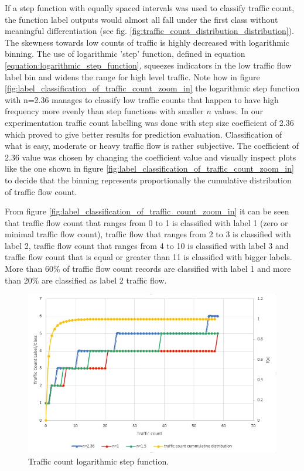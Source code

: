 \documentclass[12pt, a4paper]{report}
\theoremstyle{definition}
\theoremstyle{definition}%
\theoremstyle{definition}%
\theoremstyle{definition}%
\theoremstyle{definition}%
\theoremstyle{definition}%
\begin{document}
If a step function with equally spaced intervals was used to classify traffic count, the function label outputs would almost all fall under the first class without meaningful differentiation (see fig. \ref{fig:traffic_count_distribution_distribution}). The skewness towards low counts of traffic is highly decreased with logarithmic binning. The use of logarithmic 'step' function, defined in equation \ref{equation:logarithmic_step_function}, squeezes indicators in the low traffic flow label bin and widens the range for high level traffic. Note how in figure \ref{fig:label_classification_of_traffic_count_zoom_in} the logarithmic step function with n=2.36 manages to classify low traffic counts that happen to have high frequency more evenly than step functions with smaller $n$ values. In our experimentation traffic count labelling was done with step size coefficient of 2.36 which proved to give better results for prediction evaluation. Classification of what is easy, moderate or heavy traffic flow is rather subjective. The coefficient of 2.36 value was chosen by changing the coefficient value and visually inspect plots like the one shown in figure \ref{fig:label_classification_of_traffic_count_zoom_in} to decide that the binning represents proportionally the cumulative distribution of traffic flow count. 

From figure \ref{fig:label_classification_of_traffic_count_zoom_in} it can be seen that traffic flow count that ranges from 0 to 1 is classified with label 1 (zero or minimal traffic flow count), traffic flow that ranges from 2 to 3 is classified with label 2, traffic flow count that ranges from 4 to 10 is classified with label 3 and traffic flow count that is equal or greater than 11 is classified with bigger labels. More than 60\% of traffic flow count records are classified with label 1 and more than 20\% are classified as label 2 traffic flow. 
 
\begin{figure}[!]	
	\includegraphics[scale=0.70]{steps_function.jpg}
	\centering
	\caption{Traffic count logarithmic step function. }
	\label{fig:label_classification_of_traffic_count}
\end{figure}
\end{document}
